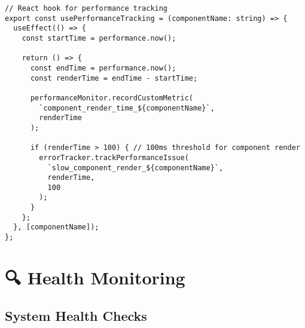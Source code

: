 \documentclass[11pt,a4paper]{article}
\begin{document}
\begin{lstlisting}[style=javascript, caption=Web Vitals Performance Monitoring]
// React hook for performance tracking
export const usePerformanceTracking = (componentName: string) => {
  useEffect(() => {
    const startTime = performance.now();
    
    return () => {
      const endTime = performance.now();
      const renderTime = endTime - startTime;
      
      performanceMonitor.recordCustomMetric(
        `component_render_time_${componentName}`,
        renderTime
      );
      
      if (renderTime > 100) { // 100ms threshold for component render
        errorTracker.trackPerformanceIssue(
          `slow_component_render_${componentName}`,
          renderTime,
          100
        );
      }
    };
  }, [componentName]);
};
\end{lstlisting}

\section{🔍 Health Monitoring}

\subsection{System Health Checks}
\end{document}
